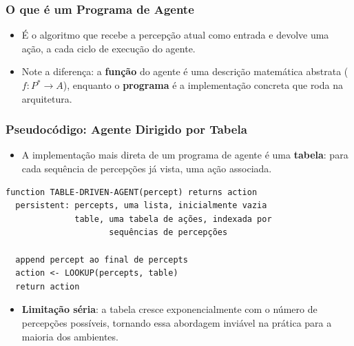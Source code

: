 \documentclass{beamer}
\begin{document}
\begin{frame}
\frametitle{O que é um Programa de Agente}
\footnotesize
\begin{itemize}
    \item É o algoritmo que recebe a percepção atual como entrada e devolve uma ação, a cada ciclo de execução do agente.
    \item Note a diferença: a \textbf{função} do agente é uma descrição matemática abstrata ($f: P^* \rightarrow A$), enquanto o \textbf{programa} é a implementação concreta que roda na arquitetura.
\end{itemize}
\begin{center}
\end{center}
\end{frame}

\begin{frame}[fragile]
\frametitle{Pseudocódigo: Agente Dirigido por Tabela}
\small
\begin{itemize}
    \item A implementação mais direta de um programa de agente é uma \textbf{tabela}: para cada sequência de percepções já vista, uma ação associada.
\end{itemize}
\begin{verbatim}
function TABLE-DRIVEN-AGENT(percept) returns action
  persistent: percepts, uma lista, inicialmente vazia
              table, uma tabela de ações, indexada por
                     sequências de percepções

  append percept ao final de percepts
  action <- LOOKUP(percepts, table)
  return action
\end{verbatim}
\begin{itemize}
    \item \textbf{Limitação séria}: a tabela cresce exponencialmente com o número de percepções possíveis, tornando essa abordagem inviável na prática para a maioria dos ambientes.
\end{itemize}
\end{frame}
\end{document}
